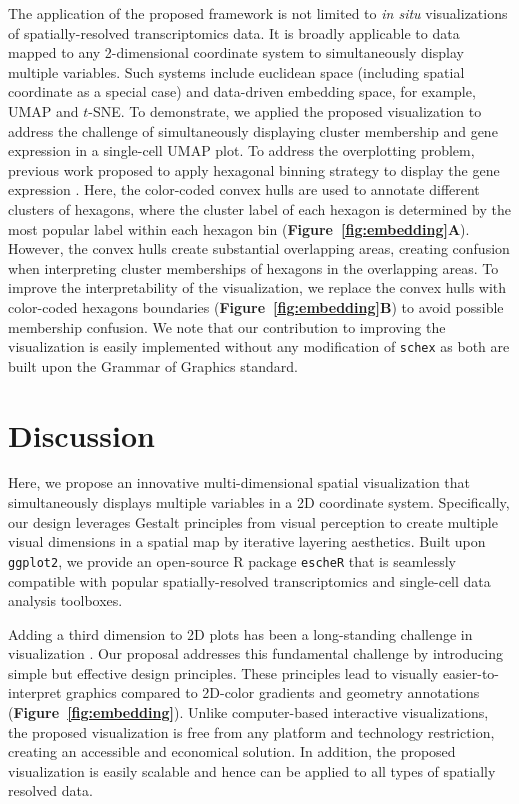 \documentclass[unnumsec,webpdf,modern,large,namedate]{oup-authoring-template}%
\theoremstyle{thmstyleone}%
\theoremstyle{thmstyletwo}%
\theoremstyle{thmstylethree}%
\begin{document}
The application of the proposed framework is not limited to \textit{in situ} visualizations of spatially-resolved transcriptomics data. It is broadly applicable to data mapped to any 2-dimensional coordinate system to simultaneously display multiple variables. Such systems include euclidean space (including spatial coordinate as a special case) and data-driven embedding space, for example, UMAP and $t$-SNE. To demonstrate, we applied the proposed visualization to address the challenge of simultaneously displaying cluster membership and gene expression in a single-cell UMAP plot. To address the overplotting problem, previous work proposed to apply hexagonal binning strategy to display the gene expression \citep{freytag_2020}. Here, the color-coded convex hulls are used to annotate different clusters of hexagons, where the cluster label of each hexagon is determined by the most popular label within each hexagon bin (\textbf{Figure~\ref{fig:embedding}A}). However, the convex hulls create substantial overlapping areas, creating confusion when interpreting cluster memberships of hexagons in the overlapping areas. To improve the interpretability of the visualization, we replace the convex hulls with color-coded hexagons boundaries (\textbf{Figure~\ref{fig:embedding}B}) to avoid possible membership confusion. We note that our contribution to improving the visualization is easily implemented without any modification of \texttt{schex} as both are built upon the Grammar of Graphics \citep{wilkinson_2012} standard.


\section{Discussion}
Here, we propose an innovative multi-dimensional spatial visualization that simultaneously displays multiple variables in a 2D coordinate system. Specifically, our design leverages Gestalt principles from visual perception to create multiple visual dimensions in a spatial map by iterative layering aesthetics. Built upon \texttt{ggplot2}, we provide an open-source R package \texttt{escheR} that is seamlessly compatible with popular spatially-resolved transcriptomics and single-cell data analysis toolboxes. 

Adding a third dimension to 2D plots has been a long-standing challenge in visualization \citep{odonoghue_2010}. Our proposal addresses this fundamental challenge by introducing simple but effective design principles. These principles lead to visually easier-to-interpret graphics compared to 2D-color gradients and geometry annotations (\textbf{Figure~\ref{fig:embedding}}). Unlike computer-based interactive visualizations, the proposed visualization is free from any platform and technology restriction, creating an accessible and economical solution. In addition, the proposed visualization is easily scalable and hence can be applied to all types of spatially resolved data. 
\end{document}
